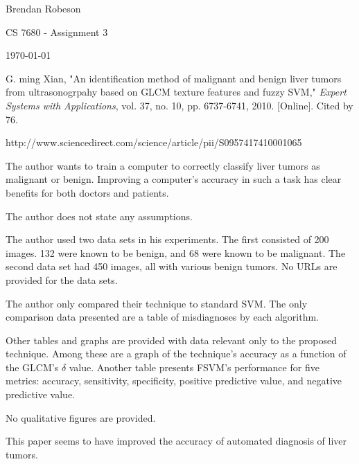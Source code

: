 \documentclass[11pt]{article}
\begin{document}
\noindent Brendan Robeson

\noindent CS 7680 - Assignment 3

\noindent \today

\medskip

\begin{description}[leftmargin=0in]
    \item [Source] G. ming Xian, "An identification method of malignant and
        benign liver tumors from ultrasonogrpahy based on GLCM texture features
        and fuzzy SVM," \emph{Expert Systems with Applications}, vol. 37, no.
        10, pp. 6737-6741, 2010. [Online]. Cited by 76.

    \item [URL]
        http://www.sciencedirect.com/science/article/pii/S0957417410001065

    \item [Problem] The author wants to train a computer to correctly classify
        liver tumors as malignant or benign. Improving a computer's accuracy in
        such a task has clear benefits for both doctors and patients.

    \item [Assumptions] The author does not state any assumptions.

    \item [Data Sets] The author used two data sets in his experiments. The
        first consisted of 200 images. 132 were known to be benign, and 68 were
        known to be malignant. The second data set had 450 images, all with
        various benign tumors. No URLs are provided for the data sets. 

    \item [Algorithm Overview]

    \item [Experiments] The author only compared their technique to standard
        SVM. The only comparison data presented are a table of misdiagnoses by
        each algorithm.

        Other tables and graphs are provided with data relevant only to the
        proposed technique. Among these are a graph of the technique's accuracy
        as a function of the GLCM's $\delta$ value. Another table presents
        FSVM's performance for five metrics: accuracy, sensitivity, specificity,
        positive predictive value, and negative predictive value.

        No qualitative figures are provided.

    \item [Contributions] This paper seems to have improved the accuracy of
        automated diagnosis of liver tumors.


\end{description}
\end{document}

